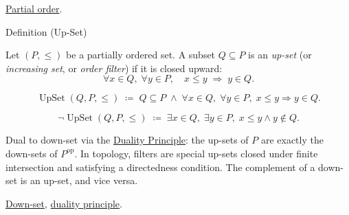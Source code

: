 \begin{dependencies}
\hyperref[def:lattice-order-partial-order]{Partial order}.
\end{dependencies}


\begin{definitionbox}{Definition (Up-Set)}
\begin{definition}[Up-Set]
\label{def:up-set}
Let $(P, \leq)$ be a partially ordered set.  A subset $Q \subseteq P$ is
an \emph{up-set} (or \emph{increasing set}, or \emph{order filter}) if it
is closed upward:
\[
\forall x \in Q,\; \forall y \in P,\quad x \leq y \;\Longrightarrow\; y \in Q.
\]
\end{definition}
\end{definitionbox}

\begin{remark*}
\[
\operatorname{UpSet}(Q, P, \leq)
\;\coloneqq\;
Q \subseteq P
\;\land\;
\forall x \in Q,\; \forall y \in P,\;
x \leq y \Rightarrow y \in Q.
\]
\end{remark*}

\begin{remark*}
\[
\neg\operatorname{UpSet}(Q, P, \leq)
\;\coloneqq\;
\exists x \in Q,\; \exists y \in P,\;
x \leq y \land y \notin Q.
\]
\end{remark*}

\begin{remark*}[Interpretation]
Dual to down-set via the
\hyperref[prop:duality-principle]{Duality Principle}: the up-sets of $P$
are exactly the down-sets of $P^{\mathrm{op}}$.  In topology, filters are
special up-sets closed under finite intersection and satisfying a
directedness condition.  The complement of a down-set is an up-set, and
vice versa.
\end{remark*}

\begin{dependencies}
\hyperref[def:down-set]{Down-set},
\hyperref[prop:duality-principle]{duality principle}.
\end{dependencies}
